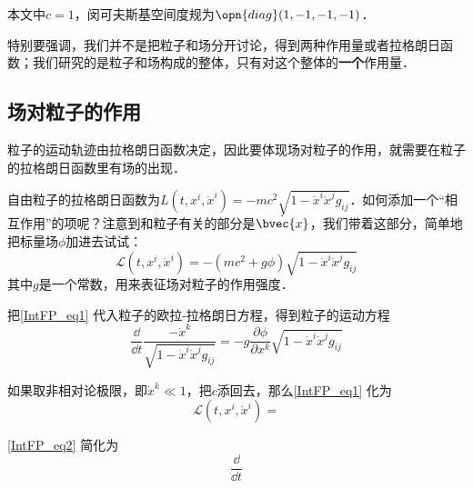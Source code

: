 

本文中$c=1$，闵可夫斯基空间度规为$\opn{diag}(1, -1, -1, -1)$．

特别要强调，我们并不是把粒子和场分开讨论，得到两种作用量或者拉格朗日函数；我们研究的是粒子和场构成的整体，只有对这个整体的\textbf{一个}作用量．

\subsection{场对粒子的作用}

粒子的运动轨迹由拉格朗日函数决定，因此要体现场对粒子的作用，就需要在粒子的拉格朗日函数里有场的出现．

自由粒子的拉格朗日函数为$L(t, x^i, \dot{x}^i) = -mc^2\sqrt{1-\dot{x}^i\dot{x}^jg_{ij}}$．如何添加一个“相互作用”的项呢？注意到和粒子有关的部分是$\dot{\bvec{x}}$，我们带着这部分，简单地把标量场$\phi$加进去试试：
\begin{equation}\label{IntFP_eq1}
\mathcal{L}(t, x^i, \dot{x}^i) = -(mc^2+g\phi)\sqrt{1-\dot{x}^i\dot{x}^jg_{ij}}
\end{equation}
其中$g$是一个常数，用来表征场对粒子的作用强度．

把\autoref{IntFP_eq1} 代入粒子的欧拉-拉格朗日方程，得到粒子的运动方程
\begin{equation}\label{IntFP_eq2}
\frac{\dd }{\dd t} \frac{-\dot{x}^k}{\sqrt{1-\dot{x}^i\dot{x}^jg_{ij}}} = -g\frac{\partial \phi}{\partial x^k}\sqrt{1-\dot{x}^i\dot{x}^jg_{ij}}
\end{equation}

如果取非相对论极限，即$\dot{x}^k\ll 1$，把$c$添回去，那么\autoref{IntFP_eq1} 化为
\begin{equation}
\mathcal{L}(t, x^i, \dot{x}^i) = 
\end{equation}

\autoref{IntFP_eq2} 简化为
\begin{equation}
\frac{\dd}{\dd t}
\end{equation}
























